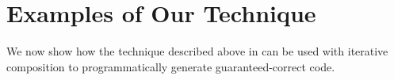\section{Examples of Our Technique}\label{s:ex}
We now show how the technique described above in  can be used with iterative composition to programmatically generate guaranteed-correct code.


